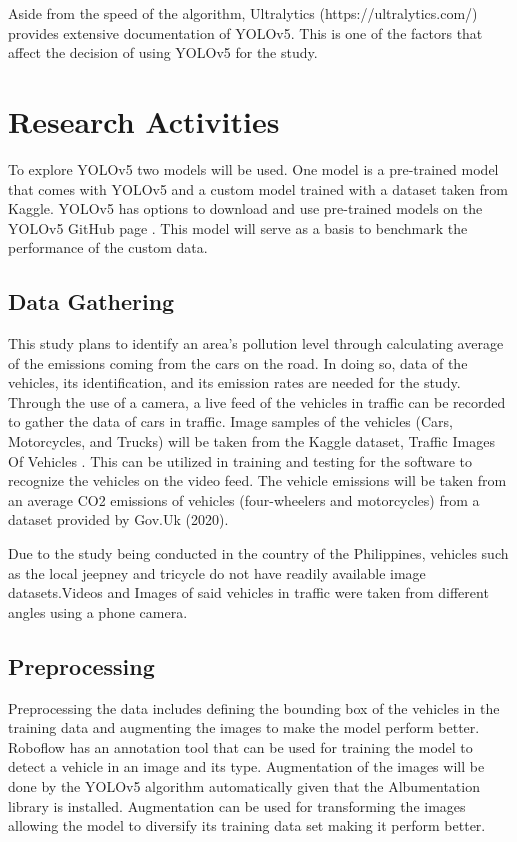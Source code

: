 Aside from the speed of the algorithm, Ultralytics (https://ultralytics.com/) provides extensive documentation of YOLOv5. This is one of the factors that affect the decision of using YOLOv5 for the study.


\section{Research Activities}
To explore YOLOv5 two models will be used. One model is a pre-trained model that comes with YOLOv5 and a custom model trained with a dataset taken from Kaggle. YOLOv5 has options to download and use pre-trained models on the YOLOv5 GitHub page \cite{ultralytics}. This model will serve as a basis to benchmark the performance of the custom data.

\subsection {Data Gathering}
This study plans to identify an area’s pollution level through calculating average of the emissions coming from the cars on the road. In doing so, data of the vehicles, its identification, and its emission rates are needed for the study. Through the use of a camera, a live feed of the vehicles in traffic can be recorded to gather the data of cars in traffic. Image samples of the vehicles (Cars, Motorcycles, and Trucks) will be taken from the Kaggle dataset, Traffic Images Of Vehicles \cite{DVN/POREXF_2020}. This can be utilized in training and testing for the software to recognize the vehicles on the video feed. The vehicle emissions will be taken from an average CO2 emissions of vehicles (four-wheelers and motorcycles) from a dataset provided by Gov.Uk (2020). 

Due to the study being conducted in the country of the Philippines, vehicles such as the local jeepney and tricycle do not have readily available image datasets.Videos and Images of said vehicles in traffic were taken from different angles using a phone camera. 


\subsection {Preprocessing}

	Preprocessing the data includes defining the bounding box of the vehicles in the training data and augmenting the images to make the model perform better. Roboflow has an annotation tool that can be used for  training the model to detect a vehicle in an image and its type. Augmentation of the images will be done by the YOLOv5 algorithm automatically given that the Albumentation library is installed. Augmentation can be used for transforming the images allowing the model to diversify its training data set making it perform better.\cite{dilmegani} 
	


